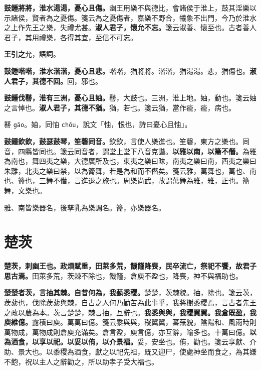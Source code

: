 \textbf{鼓鍾將將，淮水湯湯，憂心且傷。}{\footnotesize 幽王用樂不與德比，會諸侯于淮上，鼓其淫樂以示諸侯，賢者為之憂傷。箋云為之憂傷者，嘉樂不野合，犧象不出門，今乃於淮水之上作先王之樂，失禮尤甚。}\textbf{淑人君子，懷允不忘。}{\footnotesize 箋云淑善、懷至也。古者善人君子，其用禮樂，各得其宜，至信不可忘。}

\begin{quoting}\textbf{王引之}允，語詞。\end{quoting}

\textbf{鼓鍾喈喈，淮水湝湝，憂心且悲。}{\footnotesize 喈喈，猶將將。湝湝，猶湯湯。悲，猶傷也。}\textbf{淑人君子，其德不回。}{\footnotesize 回，邪也。}

\textbf{鼓鍾伐鼛，淮有三洲，憂心且妯。}{\footnotesize 鼛，大鼓也。三洲，淮上地。妯，動也。箋云妯之言悼也。}\textbf{淑人君子，其德不猶。}{\footnotesize 猶，若也。箋云猶，當作瘉，瘉，病也。}

\begin{quoting}鼛 \texttt{gāo}。妯，同怞 \texttt{chōu}，說文「怞，恨也，詩曰憂心且怞」。\end{quoting}

\textbf{鼓鍾欽欽，鼓瑟鼓琴，笙磬同音。}{\footnotesize 欽欽，言使人樂進也。笙磬，東方之樂也。同音，四縣皆同也。箋云同音者，謂堂上堂下八音克諧。}\textbf{以雅以南，以籥不僭。}{\footnotesize 為雅為南也，舞四夷之樂，大德廣所及也，東夷之樂曰昧，南夷之樂曰南，西夷之樂曰朱離，北夷之樂曰禁，以為籥舞，若是為和而不僭矣。箋云雅，萬舞也，萬也、南也、籥也，三舞不僭，言進退之旅也。周樂尚武，故謂萬舞為雅，雅，正也。籥舞，文樂也。}

\begin{quoting}雅、南皆樂器名，後孳乳為樂調名。籥，亦樂器名。\end{quoting}

\section{楚茨}


\textbf{楚茨，刺幽王也。政煩賦重，田萊多荒，饑饉降喪，民卒流亡，祭祀不饗，故君子思古焉。}{\footnotesize 田萊多荒，茨棘不除也，饑饉，倉庾不盈也，降喪，神不與福助也。}

\textbf{楚楚者茨，言抽其棘。自昔何為，我蓺黍稷。}{\footnotesize 楚楚，茨棘貌。抽，除也。箋云茨，蒺藜也，伐除蒺藜與棘，自古之人何乃勤苦為此事乎，我將樹黍稷焉，言古者先王之政以農為本。茨言楚楚，棘言抽，互辭也。}\textbf{我黍與與，我稷翼翼。我倉既盈，我庾維億。}{\footnotesize 露積曰庾。萬萬曰億。箋云黍與與，稷翼翼，蕃蕪貌，陰陽和、風雨時則萬物成，萬物成則倉庾充滿矣。倉言盈，庾言億，亦互辭，喻多也。十萬曰億。}\textbf{以為酒食，以享以祀。以妥以侑，以介景福。}{\footnotesize 妥，安坐也。侑，勸也。箋云享獻、介助、景大也。以黍稷為酒食，獻之以祀先祖，既又迎尸，使處神坐而食之，為其嫌不飽，祝以主人之辭勸之，所以助孝子受大福也。}

